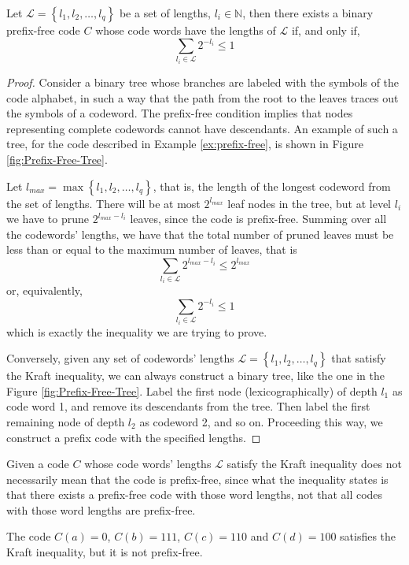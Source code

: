 \begin{theorem}
\label{th:Kraft-Inequality}
Let $\mathcal{L}=\left\{ l_{1},l_{2},\ldots,l_{q}\right\}$ be a set of lengths, $l_{i}\in\mathbb{N}$, then there exists a binary prefix-free code $C$ whose code words have the lengths of $\mathcal{L}$ if, and only if,
\[
\sum_{l_{i}\in\mathcal{L}}2^{-l_{i}}\leq1
\]
\end{theorem}
\begin{proof}
Consider a binary tree whose branches are labeled with the symbols of the code alphabet, in such a way that the path from the root to the leaves traces out the symbols of a codeword. The prefix-free condition implies that nodes representing complete codewords cannot have descendants. An example of such a tree, for the code described in Example \ref{ex:prefix-free}, is shown in Figure \ref{fig:Prefix-Free-Tree}.

Let $l_{max}=\max \left\{ l_{1},l_{2},\ldots,l_{q}\right\}$, that is, the length of the longest codeword from the set of lengths. There will be at most $2^{l_{max}}$ leaf nodes in the tree, but at level $l_{i}$ we have to prune $2^{l_{max} - l_{i}}$ leaves, since the code is prefix-free. Summing over all the codewords' lengths, we have that the total number of pruned leaves must be less than or equal to the maximum number of leaves, that is
\[
\sum_{l_{i}\in\mathcal{L}}2^{l_{max}-l_{i}} \leq 2^{l_{max}}
\]
or, equivalently,
\[
\sum_{l_{i}\in\mathcal{L}}2^{-l_{i}} \leq 1
\]
which is exactly the inequality we are trying to prove.

Conversely, given any set of codewords' lengths $\mathcal{L}=\left\{ l_{1},l_{2},\ldots,l_{q}\right\}$ that satisfy the Kraft inequality, we can always construct a binary tree, like the one in the Figure \ref{fig:Prefix-Free-Tree}. Label the first node (lexicographically) of depth $l_{1}$ as code word 1, and remove its descendants from the tree. Then label the first remaining node of depth $l_{2}$ as codeword 2, and so on. Proceeding this way, we construct a prefix code with the specified lengths.
\end{proof}

Given a code $C$ whose code words' lengths $\mathcal{L}$ satisfy the Kraft inequality does not necessarily mean that the code is prefix-free, since what the inequality states is that there exists a prefix-free code with those word lengths, not that all codes with those word lengths are prefix-free.

\begin{example}
\label{ex:not-prefix-fix}
The code $C(a)=0$, $C(b)=111$, $C(c)=110$ and $C(d)=100$ satisfies the Kraft inequality, but it is not prefix-free.
\end{example}

